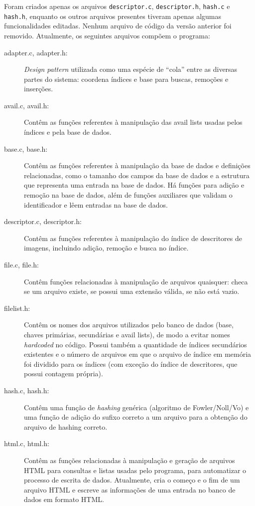 \documentclass[a4paper,10pt]{article}
\begin{document}
Foram criados apenas os arquivos \texttt{descriptor.c}, \texttt{descriptor.h}, \texttt{hash.c} e \texttt{hash.h}, enquanto os outros arquivos presentes tiveram apenas algumas funcionalidades editadas. Nenhum arquivo de código da versão anterior foi removido. Atualmente, os seguintes arquivos compõem o programa:

\begin{description}
\item[adapter.c, adapter.h:] \textit{Design pattern} utilizada como uma espécie de ``cola'' entre as diversas partes do sistema: coordena índices e base para buscas, remoções e inserções.

\item[avail.c, avail.h:] Contêm as funções referentes à manipulação das avail lists usadas pelos índices e pela base de dados.

\item[base.c, base.h:] Contêm as funções referentes à manipulação da base de dados e definições relacionadas, como o tamanho dos campos da base de dados e a estrutura que representa uma entrada na base de dados. Há funções para adição e remoção na base de dados, além de funções auxiliares que validam o identificador e lêem entradas na base de dados.

\item[descriptor.c, descriptor.h:] Contêm as funções referentes à manipulação do índice de descritores de imagens, incluindo adição, remoção e busca no índice.

 \item[file.c, file.h:] Contêm funções relacionadas à manipulação de arquivos quaisquer: checa se um arquivo existe, se possui uma extensão válida, se não está vazio.

\item[filelist.h:] Contêm os nomes dos arquivos utilizados pelo banco de dados (base, chaves primárias, secundárias e avail lists), de modo a evitar nomes \textit{hardcoded} no código. Possui também a quantidade de índices secundários existentes e o número de arquivos em que o arquivo de índice em memória foi dividido para os índices (com exceção do índice de descritores, que possui contagem própria).

\item[hash.c, hash.h:] Contêm uma função de \textit{hashing} genérica (algoritmo de Fowler/Noll/Vo) e uma função de adição do sufixo correto a um arquivo para a obtenção do arquivo de hashing correto.

\item[html.c, html.h:] Contêm as funções relacionadas à manipulação e geração de arquivos HTML para consultas e listas usadas pelo programa, para automatizar o processo de escrita de dados. Atualmente, cria o começo e o fim de um arquivo HTML e escreve as informações de uma entrada no banco de dados em formato HTML.


\end{description}
\end{document}
